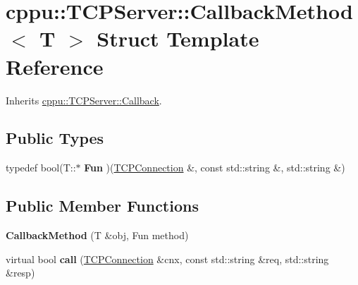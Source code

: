 \hypertarget{structcppu_1_1_t_c_p_server_1_1_callback_method}{\section{cppu\+:\+:T\+C\+P\+Server\+:\+:Callback\+Method$<$ T $>$ Struct Template Reference}
\label{structcppu_1_1_t_c_p_server_1_1_callback_method}
}


Inherits \hyperlink{structcppu_1_1_t_c_p_server_1_1_callback}{cppu\+::\+T\+C\+P\+Server\+::\+Callback}.

\subsection*{Public Types}
\begin{DoxyCompactItemize}
\item 
\hypertarget{structcppu_1_1_t_c_p_server_1_1_callback_method_a2911cc72786a989aa57c660248ffb44c}{typedef bool(T\+::$\ast$ {\bfseries Fun} )(\hyperlink{classcppu_1_1_t_c_p_connection}{T\+C\+P\+Connection} \&, const std\+::string \&, std\+::string \&)}\label{structcppu_1_1_t_c_p_server_1_1_callback_method_a2911cc72786a989aa57c660248ffb44c}

\end{DoxyCompactItemize}
\subsection*{Public Member Functions}
\begin{DoxyCompactItemize}
\item 
\hypertarget{structcppu_1_1_t_c_p_server_1_1_callback_method_a0c6ceee6db8c67ef56fb26d1df52140f}{{\bfseries Callback\+Method} (T \&obj, Fun method)}\label{structcppu_1_1_t_c_p_server_1_1_callback_method_a0c6ceee6db8c67ef56fb26d1df52140f}

\item 
\hypertarget{structcppu_1_1_t_c_p_server_1_1_callback_method_a0c11039d0ed983c03a614d0764df3793}{virtual bool {\bfseries call} (\hyperlink{classcppu_1_1_t_c_p_connection}{T\+C\+P\+Connection} \&cnx, const std\+::string \&req, std\+::string \&resp)}\label{structcppu_1_1_t_c_p_server_1_1_callback_method_a0c11039d0ed983c03a614d0764df3793}

\end{DoxyCompactItemize}
